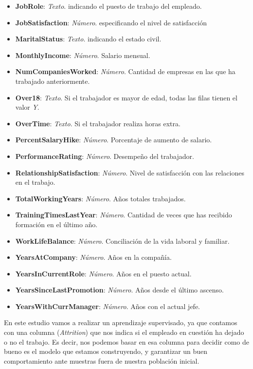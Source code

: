 \begin{itemize}
\item \textbf{JobRole}: \textit{Texto}. indicando el puesto de trabajo del empleado.
\item \textbf{JobSatisfaction}: \textit{Número}. especificando el nivel de satisfacción
\item \textbf{MaritalStatus}: \textit{Texto}. indicando el estado civil.
\item \textbf{MonthlyIncome}: \textit{Número}. Salario mensual.
\item \textbf{NumCompaniesWorked}: \textit{Número}. Cantidad de empresas en las que ha trabajado anteriormente.
\item \textbf{Over18}: \textit{Texto}. Si el trabajador es mayor de edad, todas las filas tienen el valor \textit{Y}.
\item \textbf{OverTime}: \textit{Texto}. Si el trabajador realiza horas extra.
\item \textbf{PercentSalaryHike}: \textit{Número}. Porcentaje de aumento de salario.
\item \textbf{PerformanceRating}: \textit{Número}. Desempeño del trabajador.
\item \textbf{RelationshipSatisfaction}: \textit{Número}. Nivel de satisfacción con las relaciones en el trabajo.
\item \textbf{TotalWorkingYears}: \textit{Número}. Años totales trabajados.
\item \textbf{TrainingTimesLastYear}: \textit{Número}. Cantidad de veces que has recibido formación en el último año.
\item \textbf{WorkLifeBalance}: \textit{Número}. Conciliación de la vida laboral y familiar.
\item \textbf{YearsAtCompany}: \textit{Número}. Años en la compañía.
\item \textbf{YearsInCurrentRole}: \textit{Número}. Años en el puesto actual.
\item \textbf{YearsSinceLastPromotion}: \textit{Número}. Años desde el último ascenso.
\item \textbf{YearsWithCurrManager}: \textit{Número}. Años con el actual jefe.

\end{itemize}



En este estudio vamos a realizar un aprendizaje supervisado, ya que contamos con una columna (\textit{Attrition}) que nos indica si el empleado en cuestión ha dejado o no el trabajo.
Es decir, nos podemos basar en esa columna para decidir como de bueno es el modelo que estamos construyendo, y garantizar un buen comportamiento ante muestras fuera de nuestra población inicial.\\


